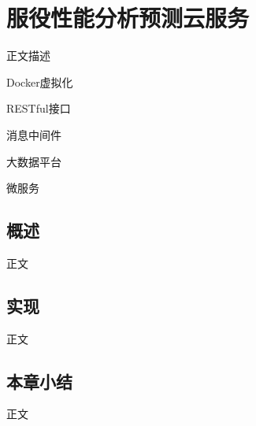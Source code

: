 \chapter{服役性能分析预测云服务}
\label{chap:service}

正文描述

Docker虚拟化

RESTful接口

消息中间件

大数据平台

微服务

\section{概述}

正文




\section{实现}

正文




\section{本章小结}

正文